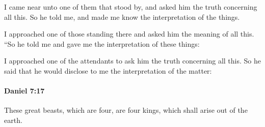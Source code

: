 			\begin{versebox}
					\item[BHS] 
					\item[LXX] 
					\item[ASV] I came near unto one of them that stood by, and asked him the truth concerning all this. So he told me, and made me know the interpretation of the things.
					\item[NIV] I approached one of those standing there and asked him the meaning of all this. “So he told me and gave me the interpretation of these things:
					\item[NRSV] I approached one of the attendants to ask him the truth concerning all this. So he said that he would disclose to me the interpretation of the matter:
			\end{versebox}

		\paragraph{Daniel 7:17} %
			\label{DANIEL-7-17}

			These great beasts, which are four, are four kings, which shall arise out of the earth.

